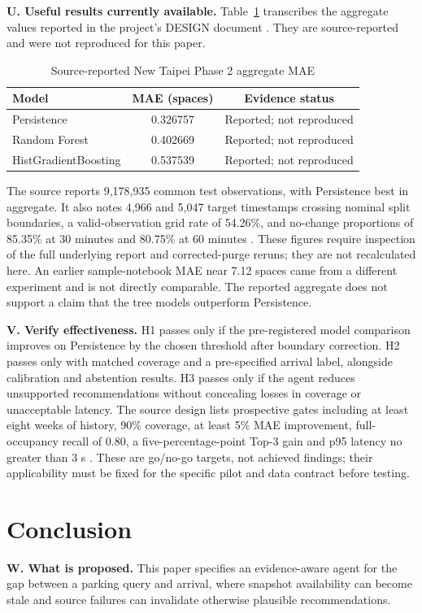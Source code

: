 \documentclass[conference,letterpaper,10pt]{IEEEtran}
\begin{document}
\noindent\textbf{U. Useful results currently available.} Table~\ref{tab:reported} transcribes the aggregate values reported in the project's DESIGN document \cite{dic3design}. They are source-reported and were not reproduced for this paper.

\begin{table}[t]
\caption{Source-reported New Taipei Phase 2 aggregate MAE}
\label{tab:reported}
\centering
\footnotesize
\begin{tabular}{lcc}
\toprule
Model & MAE (spaces) & Evidence status \\
\midrule
Persistence & 0.326757 & Reported; not reproduced \\
Random Forest & 0.402669 & Reported; not reproduced \\
HistGradientBoosting & 0.537539 & Reported; not reproduced \\
\bottomrule
\end{tabular}
\end{table}

The source reports 9,178,935 common test observations, with Persistence best in aggregate. It also notes 4,966 and 5,047 target timestamps crossing nominal split boundaries, a valid-observation grid rate of 54.26\%, and no-change proportions of 85.35\% at 30 minutes and 80.75\% at 60 minutes \cite{dic3design}. These figures require inspection of the full underlying report and corrected-purge reruns; they are not recalculated here. An earlier sample-notebook MAE near 7.12 spaces came from a different experiment and is not directly comparable. The reported aggregate does not support a claim that the tree models outperform Persistence.

\noindent\textbf{V. Verify effectiveness.} H1 passes only if the pre-registered model comparison improves on Persistence by the chosen threshold after boundary correction. H2 passes only with matched coverage and a pre-specified arrival label, alongside calibration and abstention results. H3 passes only if the agent reduces unsupported recommendations without concealing losses in coverage or unacceptable latency. The source design lists prospective gates including at least eight weeks of history, 90\% coverage, at least 5\% MAE improvement, full-occupancy recall of 0.80, a five-percentage-point Top-3 gain and p95 latency no greater than 3 s \cite{dic3design}. These are go/no-go targets, not achieved findings; their applicability must be fixed for the specific pilot and data contract before testing.

\section{Conclusion}
\noindent\textbf{W. What is proposed.} This paper specifies an evidence-aware agent for the gap between a parking query and arrival, where snapshot availability can become stale and source failures can invalidate otherwise plausible recommendations.
\end{document}
